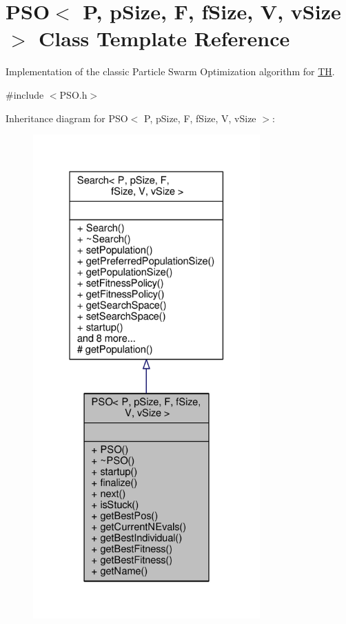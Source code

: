 \hypertarget{classPSO}{}\section{P\+SO$<$ P, p\+Size, F, f\+Size, V, v\+Size $>$ Class Template Reference}
\label{classPSO}


Implementation of the classic Particle Swarm Optimization algorithm for \hyperlink{classTH}{TH}.  




{\ttfamily \#include $<$P\+S\+O.\+h$>$}



Inheritance diagram for P\+SO$<$ P, p\+Size, F, f\+Size, V, v\+Size $>$\+:\nopagebreak
\begin{figure}[H]
\begin{center}
\leavevmode
\includegraphics[width=247pt]{classPSO__inherit__graph}
\end{center}
\end{figure}


